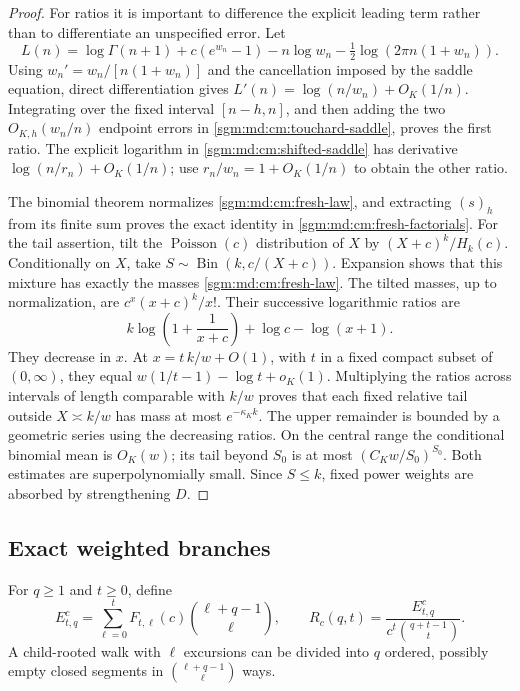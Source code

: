 \documentclass[11pt,letterpaper]{article}
\theoremstyle{remark}\newtheorem{remark}[theorem]{Remark}
\newcommand{\Poi}{\operatorname{Poisson}}\newcommand{\Bin}{\operatorname{Bin}}
\newcommand{\fall}[2]{(#1)_{#2}}\newcommand{\rise}[2]{#1^{\overline{#2}}}
\theoremstyle{definition}\newtheorem{definition}[theorem]{Definition}
\begin{document}
\begin{proof}
For ratios it is important to difference the explicit leading term
rather than to differentiate an unspecified error. Let
\[
 L(n)=\log\Gamma(n+1)+c(e^{w_n}-1)-n\log w_n
                    -\tfrac12\log(2\pi n(1+w_n)).
\]
Using \(w_n'=w_n/[n(1+w_n)]\) and the cancellation imposed by the
saddle equation, direct differentiation gives
\(L'(n)=\log(n/w_n)+O_K(1/n)\).
Integrating over the fixed interval \([n-h,n]\), and then adding
the two \(O_{K,h}(w_n/n)\) endpoint errors in
\eqref{sgm:md:cm:touchard-saddle}, proves the first ratio.
The explicit logarithm in \eqref{sgm:md:cm:shifted-saddle} has derivative
\(\log(n/r_n)+O_K(1/n)\); use
\(r_n/w_n=1+O_K(1/n)\) to obtain the other ratio.

The binomial theorem normalizes \eqref{sgm:md:cm:fresh-law}, and extracting
\(\fall{s}{h}\) from its finite sum proves the exact identity in
\eqref{sgm:md:cm:fresh-factorials}. For the tail assertion, tilt the
\(\Poi(c)\) distribution of \(X\) by \((X+c)^k/H_k(c)\).
Conditionally on \(X\), take
\(S\sim\operatorname{Bin}(k,c/(X+c))\). Expansion shows that this
mixture has exactly the masses \eqref{sgm:md:cm:fresh-law}.
The tilted masses, up to normalization, are
\(c^x(x+c)^k/x!\). Their successive logarithmic ratios are
\[
 k\log\left(1+\frac1{x+c}\right)+\log c-\log(x+1).
\]
They decrease in \(x\). At \(x=t\,k/w+O(1)\), with \(t\) in a
fixed compact subset of \((0,\infty)\), they equal
\(w(1/t-1)-\log t+o_K(1)\).
Multiplying the ratios across intervals of length comparable with
\(k/w\) proves that each fixed relative tail outside \(X\asymp k/w\)
has mass at most \(e^{-\kappa_K k}\). The upper remainder is bounded
by a geometric series using the decreasing ratios. On the central
range the conditional binomial mean is \(O_K(w)\); its tail beyond
\(S_0\) is at most
\((C_Kw/S_0)^{S_0}\). Both estimates are superpolynomially small.
Since \(S\le k\), fixed power weights are absorbed by strengthening
\(D\).
\end{proof}

\subsection{Exact weighted branches}

For \(q\ge1\) and \(t\ge0\), define
\begin{equation}\label{sgm:md:cm:child}
 E^c_{t,q}=\sum_{\ell=0}^t F_{t,\ell}(c)
                         \binom{\ell+q-1}{\ell},
 \qquad
 R_c(q,t)=\frac{E^c_{t,q}}{c^t\binom{q+t-1}{t}}.
\end{equation}
A child-rooted walk with \(\ell\) excursions can be divided into
\(q\) ordered, possibly empty closed segments in
\(\binom{\ell+q-1}{\ell}\) ways.
\end{document}
